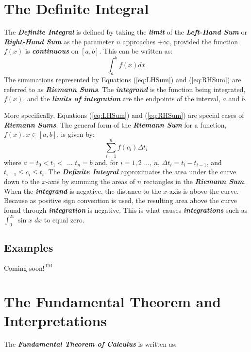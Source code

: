 \section{The Definite Integral}
The \textbf{\textit{Definite Integral}} is defined by taking the \textbf{\textit{limit}} of the \textbf{\textit{Left-Hand Sum}} or \textbf{\textit{Right-Hand Sum}} as the parameter $n$ approaches $+\infty$, provided the function $f(x)$ is \textbf{\textit{continuous}} on $[a, b]$. This can be written as:
%
\begin{equation}
\int_a^b f(x)dx
\end{equation}
%
The summations represented by Equations (\ref{eq:LHSum}) and (\ref{eq:RHSum}) are referred to as \textbf{\textit{Riemann Sums}}. The \textbf{\textit{integrand}} is the function being integrated, $f(x)$, and the \textbf{\textit{limits of integration}} are the endpoints of the interval, $a$ and $b$.

\vspace{0.1in}
More specifically, Equations (\ref{eq:LHSum}) and (\ref{eq:RHSum}) are special cases of \textbf{\textit{Riemann Sums}}. The general form of the \textbf{\textit{Riemann Sum}} for a function, $f(x), x \in [a, b]$, is given by:
%
\begin{equation}
\sum_{i=1}^n f\left(c_i\right) \Delta t_i
\end{equation}
%
where $a = t_0 < t_1 <$ ... $t_n = b$ and, for $i = 1, 2$ ..., $n$, $\Delta t_i = t_i - t_{i-1}$, and $t_{i-1} \leq c_i \leq t_i$.
\vspace{0.1in}
The \textbf{\textit{Definite Integral}} approximates the area under the curve down to the $x$-axis by summing the areas of $n$ rectangles in the \textbf{\textit{Riemann Sum}}. When the \textbf{\textit{integrand}} is negative, the distance to the $x$-axis is above the curve. Because as positive sign convention is used, the resulting area above the curve found through  \textbf{\textit{integration}} is negative. This is what causes \textbf{\textit{integrations}} such as $\int_0^{2\pi} \sin x$ $dx$ to equal zero.

\begin{center}
\section*{\small Examples}
Coming soon$!^{\text{TM}}$
\end{center}

\section{The Fundamental Theorem and Interpretations}
The \textbf{\textit{Fundamental Theorem of Calculus}} is written as:

